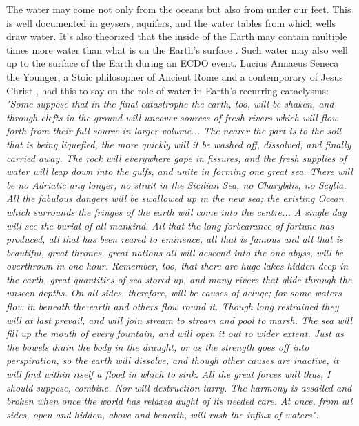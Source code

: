 \documentclass[10pt,twocolumn,letterpaper]{article}
\begin{document}
The water may come not only from the oceans but also from under our feet. This is well documented in geysers, aquifers, and the water tables from which wells draw water. It's also theorized that the inside of the Earth may contain multiple times more water than what is on the Earth's surface \cite{4}. Such water may also well up to the surface of the Earth during an ECDO event. Lucius Annaeus Seneca the Younger, a Stoic philosopher of Ancient Rome and a contemporary of Jesus Christ \cite{7}, had this to say on the role of water in Earth's recurring cataclysms: \textit{"Some suppose that in the final catastrophe the earth, too, will be shaken, and through clefts in the ground will uncover sources of fresh rivers which will flow forth from their full source in larger volume... The nearer the part is to the soil that is being liquefied, the more quickly will it be washed off, dissolved, and finally carried away. The rock will everywhere gape in fissures, and the fresh supplies of water will leap down into the gulfs, and unite in forming one great sea. There will be no Adriatic any longer, no strait in the Sicilian Sea, no Charybdis, no Scylla. All the fabulous dangers will be swallowed up in the new sea; the existing Ocean which surrounds the fringes of the earth will come into the centre... A single day will see the burial of all mankind. All that the long forbearance of fortune has produced, all that has been reared to eminence, all that is famous and all that is beautiful, great thrones, great nations all will descend into the one abyss, will be overthrown in one hour. Remember, too, that there are huge lakes hidden deep in the earth, great quantities of sea stored up, and many rivers that glide through the unseen depths. On all sides, therefore, will be causes of deluge; for some waters flow in beneath the earth and others flow round it. Though long restrained they will at last prevail, and will join stream to stream and pool to marsh. The sea will fill up the mouth of every fountain, and will open it out to wider extent. Just as the bowels drain the body in the draught, or as the strength goes off into perspiration, so the earth will dissolve, and though other causes are inactive, it will find within itself a flood in which to sink. All the great forces will thus, I should suppose, combine. Nor will destruction tarry. The harmony is assailed and broken when once the world has relaxed aught of its needed care. At once, from all sides, open and hidden, above and beneath, will rush the influx of waters"}. \cite{8}
\end{document}
